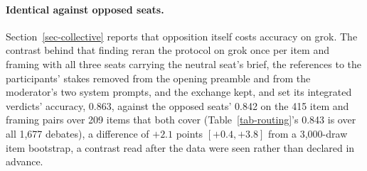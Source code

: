 \paragraph{Identical against opposed seats.}
Section~\ref{sec-collective} reports that opposition itself costs accuracy on
grok. The contrast behind that finding reran the protocol on grok once per
item and framing with all three seats carrying the neutral seat's brief, the
references to the participants' stakes removed from the opening preamble and
from the moderator's two system prompts, and the exchange kept, and set its
integrated verdicts' accuracy, 0.863, against the opposed seats' 0.842 on the
415 item and framing pairs over 209 items that both cover
(Table~\ref{tab-routing}'s 0.843 is over all 1,677 debates), a difference of
$+2.1$ points $[+0.4, +3.8]$ from a 3,000-draw item bootstrap, a contrast read
after the data were seen rather than declared in advance.

